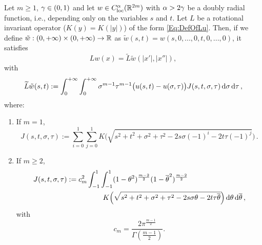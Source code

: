 \begin{lemma}
\label{Lemma:OperatorInSTVariables} Let $m \geq 1$, $\gamma\in(0,1)$ and let $w\in
C_{\mathrm{loc}}^\alpha(\mathbb{R}^{2m})$ with $\alpha > 2\gamma$ be a doubly radial function, i.e., depending only on
the variables $s$ and $t$. Let $L$ be a rotational invariant operator ($K(y) = K(|y|)$) of the form
\eqref{Eq:DefOfLu}. Then, if we define $\tilde{w}:(0,+\infty)\times (0,+\infty) \to \mathbb{R}$ as
$\tilde{w}(s,t) = w(s,0,...,0,t,0,...,0)$, it satisfies
$$ Lw(x) = \tilde{L} \tilde{w} (|x'|,|x''|), $$
with
\begin{equation*}
\label{Eq:OperatorInSTVariables}
\widetilde{L} \tilde{w} (s,t) := \int_0^{+\infty}  \int_0^{+\infty} \sigma^{m-1} \tau^{m-1} \big(u(s,t) - u(\sigma, \tau)\big) J(s,t,\sigma, \tau)  \,\mathrm{d} \sigma\,\mathrm{d} \tau\,,
\end{equation*}
where:
\begin{enumerate}
	\item If $m= 1$,
	\begin{equation}
		\label{Eq:KernelInSTVariablesR2}
	J(s,t,\sigma, \tau) := \sum_{i=0}^1  \sum_{j =0}^1  K\Big(\sqrt{s^2 + t^2 + \sigma^2 + \tau^2 -2 s \sigma (-1)^i -2 t \tau (-1)^j}\Big)\,.
	\end{equation}
	
	\item If $m\geq 2$,
	\begin{align}
	J(s,t,\sigma, \tau) &:= c_m ^2  \int_{-1}^1  \int_{-1}^1  (1-\theta^2)^{\frac{m-2}{2}} (1-\overline{\theta}^2)^{\frac{m-2}{2}} \nonumber\\
	& \quad \quad \quad \quad \quad
	K\Big(\sqrt{s^2 + t^2 + \sigma^2 + \tau^2 -2 s \sigma \theta -2 t \tau \overline{\theta}}\Big) \,\mathrm{d} \theta \,\mathrm{d} \overline{\theta}\,, \label{Eq:KernelSTVariables2}
	\end{align}
	with
	$$
	c_m = \dfrac{2 \pi^{\frac{m-1}{2}}}{\Gamma (\frac{m-1}{2})}.
	$$
\end{enumerate}
\end{lemma}



